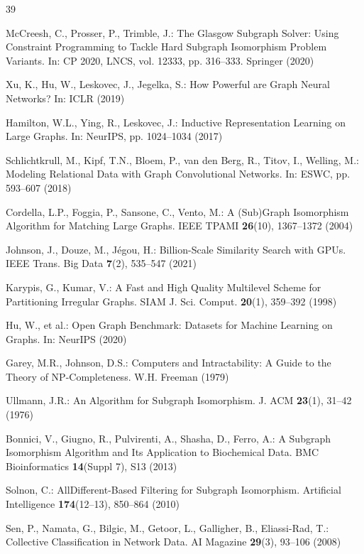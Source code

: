 \documentclass[runningheads]{llncs}
\begin{document}
\begin{thebibliography}{39}
\footnotesize

McCreesh, C., Prosser, P., Trimble, J.: The Glasgow Subgraph Solver: Using Constraint Programming to Tackle Hard Subgraph Isomorphism Problem Variants. In: CP 2020, LNCS, vol. 12333, pp. 316--333. Springer (2020)

Xu, K., Hu, W., Leskovec, J., Jegelka, S.: How Powerful are Graph Neural Networks? In: ICLR (2019)

Hamilton, W.L., Ying, R., Leskovec, J.: Inductive Representation Learning on Large Graphs. In: NeurIPS, pp. 1024--1034 (2017)

Schlichtkrull, M., Kipf, T.N., Bloem, P., van den Berg, R., Titov, I., Welling, M.: Modeling Relational Data with Graph Convolutional Networks. In: ESWC, pp. 593--607 (2018)

Cordella, L.P., Foggia, P., Sansone, C., Vento, M.: A (Sub)Graph Isomorphism Algorithm for Matching Large Graphs. IEEE TPAMI \textbf{26}(10), 1367--1372 (2004)

Johnson, J., Douze, M., J\'egou, H.: Billion-Scale Similarity Search with GPUs. IEEE Trans. Big Data \textbf{7}(2), 535--547 (2021)

Karypis, G., Kumar, V.: A Fast and High Quality Multilevel Scheme for Partitioning Irregular Graphs. SIAM J. Sci. Comput. \textbf{20}(1), 359--392 (1998)

Hu, W., et al.: Open Graph Benchmark: Datasets for Machine Learning on Graphs. In: NeurIPS (2020)

Garey, M.R., Johnson, D.S.: Computers and Intractability: A Guide to the Theory of NP-Completeness. W.H. Freeman (1979)

Ullmann, J.R.: An Algorithm for Subgraph Isomorphism. J. ACM \textbf{23}(1), 31--42 (1976)

Bonnici, V., Giugno, R., Pulvirenti, A., Shasha, D., Ferro, A.: A Subgraph Isomorphism Algorithm and Its Application to Biochemical Data. BMC Bioinformatics \textbf{14}(Suppl 7), S13 (2013)

Solnon, C.: AllDifferent-Based Filtering for Subgraph Isomorphism. Artificial Intelligence \textbf{174}(12--13), 850--864 (2010)

Sen, P., Namata, G., Bilgic, M., Getoor, L., Galligher, B., Eliassi-Rad, T.: Collective Classification in Network Data. AI Magazine \textbf{29}(3), 93--106 (2008)


\end{thebibliography}
\end{document}
